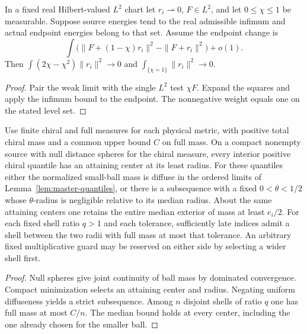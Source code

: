 \begin{lemma}
\label{lem:ed03-weighted-defect}
\leanok
In a fixed real Hilbert-valued \(L^2\) chart let \(r_i\rightharpoonup0\),
\(F\in L^2\), and let \(0\le\chi\le1\) be measurable.
Suppose source energies tend to the real admissible infimum and
actual endpoint energies belong to that set. Assume the endpoint change is
\[
 \int\bigl(\|F+(1-\chi)r_i\|^2-\|F+r_i\|^2\bigr)+o(1).
\]
Then \(\int(2\chi-\chi^2)\|r_i\|^2\to0\) and
\(\int_{\{\chi=1\}}\|r_i\|^2\to0\).
\end{lemma}
\begin{proof}
\leanok
Pair the weak limit with the single \(L^2\) test \(\chi F\).
Expand the squares and apply the infimum bound to the endpoint.
The nonnegative weight equals one on the stated level set.
\end{proof}

\begin{lemma}
\label{lem:ed03-measure-quantiles}
\leanok
Use finite chiral and full measures for each physical metric, with positive
total chiral mass and a common upper bound \(C\) on full mass.
On a compact nonempty source with null distance spheres for the chiral
measure, every interior positive chiral quantile has an attaining center
at its least radius. For these quantiles either the normalized small-ball
mass is diffuse in the ordered limits of Lemma~\ref{lem:master-quantiles},
or there is a subsequence with a fixed \(0<\theta<1/2\) whose
\(\theta\)-radius is negligible relative to its median radius.
About the same attaining centers one retains the entire median exterior
of mass at least \(e_i/2\). For each fixed shell ratio \(q>1\) and
each tolerance, sufficiently late indices admit a shell between the
two radii with full mass at most that tolerance. An arbitrary fixed
multiplicative guard may be reserved on either side by selecting a wider
shell first.
\end{lemma}
\begin{proof}
\leanok
Null spheres give joint continuity of ball mass by dominated convergence.
Compact minimization selects an attaining center and radius. Negating uniform
diffuseness yields a strict subsequence. Among \(n\) disjoint shells of ratio
\(q\) one has full mass at most \(C/n\). The median bound holds at every
center, including the one already chosen for the smaller ball.
\end{proof}

